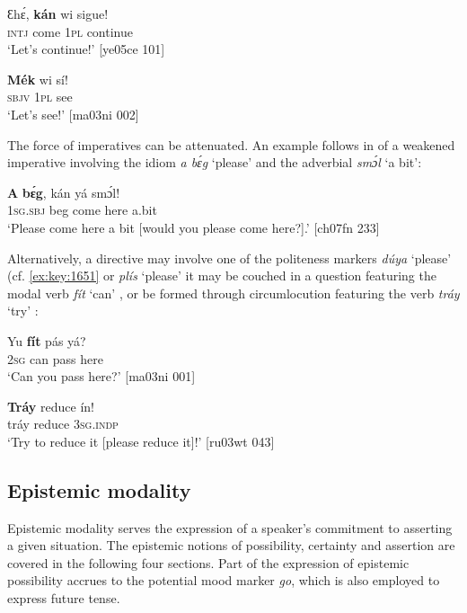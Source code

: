 \ea%
    \label{ex:key:437}
    \gll Ɛhɛ́,    \textbf{kán}    wi  sigue!\\
\textsc{intj}    come  \textsc{1pl}  continue\\

\glt ‘Let’s continue!’ [ye05ce 101] 
\z


\ea%
    \label{ex:key:438}
    \gll \textbf{Mék} wi  sí!\\
\textsc{sbjv}    \textsc{1pl}  see\\

\glt ‘Let’s see!’ [ma03ni 002]
\z

The force of imperatives can be attenuated. An example follows in  of a weakened imperative involving the idiom \textit{a bɛ́g} ‘please’ and the adverbial \textit{smɔ́l} ‘a bit’:


\ea%
    \label{ex:key:439}
    \gll \textbf{A}    \textbf{bɛ́g}, kán    yá    smɔ́l!\\
\textsc{1sg.sbj}  beg  come  here    a.bit\\

\glt ‘Please come here a bit [would you please come here?].’ [ch07fn 233]
\z

Alternatively, a directive may involve one of the politeness markers \textit{dúya} ‘please’ (cf. \ref{ex:key:1651} or \textit{plís} ‘please’ it may be couched in a question featuring the modal verb \textit{fít} ‘can’ , or be formed through circumlocution featuring the verb \textit{tráy} ‘try’ :


\ea%
    \label{ex:key:440}
    \gll Yu  \textbf{fít}  pás  yá?\\
\textsc{2sg}  can  pass  here\\

\glt ‘Can you pass here?’ [ma03ni 001]
\z


\ea%
    \label{ex:key:441}
    \gll \textbf{Tráy}  reduce  ín!\\
tráy    reduce  \textsc{3sg.indp}\\

\glt ‘Try to reduce it [please reduce it]!’ [ru03wt 043]
\z

\subsection{Epistemic modality}

Epistemic modality serves the expression of a speaker’s commitment to asserting a given situation. The epistemic notions of possibility, certainty and assertion are covered in the following four sections. Part of the expression of epistemic possibility accrues to the potential mood marker \textit{go}, which is also employed to express future tense.

